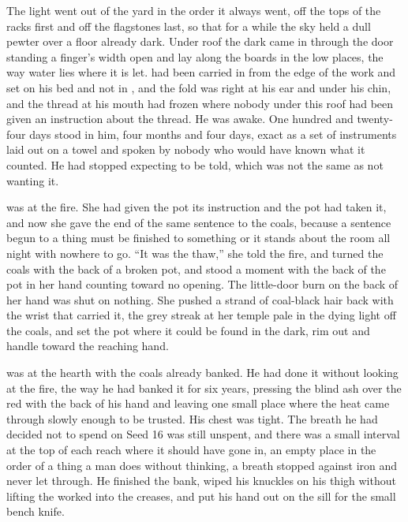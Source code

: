 The light went out of the yard in the order it always went, off the tops of the racks first and off the flagstones last, so that for a while the sky held a dull pewter over a floor already dark. Under  roof the dark came in through the door standing a finger's width open and lay along the boards in the low places, the way water lies where it is let.  had been carried in from the edge of the work and set on his bed and not in , and the fold was right at his ear and under his chin, and the thread at his mouth had frozen where nobody under this roof had been given an instruction about the thread. He was awake. One hundred and twenty-four days stood in him, four months and four days, exact as a set of instruments laid out on a towel and spoken by nobody who would have known what it counted. He had stopped expecting to be told, which was not the same as not wanting it.

 was at the fire. She had given the pot its instruction and the pot had taken it, and now she gave the end of the same sentence to the coals, because a sentence begun to a thing must be finished to something or it stands about the room all night with nowhere to go. “It was the thaw,” she told the fire, and turned the coals with the back of a broken pot, and stood a moment with the back of the pot in her hand counting toward no opening. The little-door burn on the back of her hand was shut on nothing. She pushed a strand of coal-black hair back with the wrist that carried it, the grey streak at her temple pale in the dying light off the coals, and set the pot where it could be found in the dark, rim out and handle toward the reaching hand.

 was at the hearth with the coals already banked. He had done it without looking at the fire, the way he had banked it for six years, pressing the blind ash over the red with the back of his hand and leaving one small place where the heat came through slowly enough to be trusted. His chest was tight. The breath he had decided not to spend on Seed 16 was still unspent, and there was a small interval at the top of each reach where it should have gone in, an empty place in the order of a thing a man does without thinking, a breath stopped against iron and never let through. He finished the bank, wiped his knuckles on his thigh without lifting the  worked into the creases, and put his hand out on the sill for the small bench knife.

